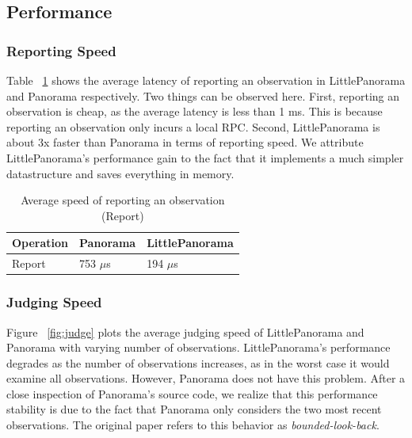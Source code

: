 \subsection{Performance}
\subsubsection{Reporting Speed} Table ~\ref{tab:microbench} shows the average latency of reporting an observation in LittlePanorama and Panorama respectively. Two things can be observed here. First, reporting an observation is cheap, as the average latency is less than 1 ms. This is because reporting an observation only incurs a local RPC. Second, LittlePanorama is about 3x faster than Panorama in terms of reporting speed. We attribute LittlePanorama's performance gain to the fact that it implements a much simpler datastructure and saves everything in memory.

\begin{table}[!tb]
\begin{tabular}{p{}p{}p{}}%

\textbf{Operation} & \textbf{Panorama} & \textbf{LittlePanorama} \\
\midrule
  Report   &    753 $\mu$s  &  194 $\mu$s  \\
\end{tabular}
\vspace{0.5em}
\caption{Average speed of reporting an observation (Report)}
\label{tab:microbench}
\end{table}

\subsubsection{Judging Speed} Figure ~\ref{fig:judge} plots the average judging speed of LittlePanorama and Panorama with varying number of observations. LittlePanorama's performance degrades as the number of observations increases, as in the worst case it would examine all observations. However, Panorama does not have this problem. After a close inspection of Panorama's source code, we realize that this performance stability is due to the fact that Panorama only considers the two most recent observations. The original paper refers to this behavior as \textit{bounded-look-back}.

